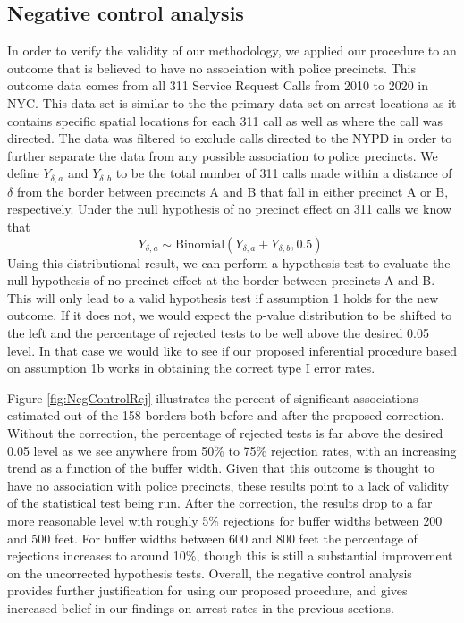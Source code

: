 \documentclass[a4paper,11pt]{article}
\begin{document}
\subsection{Negative control analysis}

In order to verify the validity of our methodology, we applied our procedure to an outcome that is believed to have no association with police precincts. This outcome data comes from all 311 Service Request Calls from 2010 to 2020 in NYC. This data set is similar to the the primary data set on arrest locations as it contains specific spatial locations for each 311 call as well as where the call was directed. The data was filtered to exclude calls directed to the NYPD in order to further separate the data from any possible association to police precincts. We define $Y_{\delta, a}$ and $Y_{\delta, b}$ to be the total number of 311 calls made within a distance of $\delta$ from the border between precincts A and B that fall in either precinct A or B, respectively. Under the null hypothesis of no precinct effect on 311 calls we know that 
$$Y_{\delta, a} \sim \text{Binomial}(Y_{\delta, a} + Y_{\delta, b}, 0.5).$$
Using this distributional result, we can perform a hypothesis test to evaluate the null hypothesis of no precinct effect at the border between precincts A and B. This will only lead to a valid hypothesis test if assumption 1 holds for the new outcome. If it does not, we would expect the p-value distribution to be shifted to the left and the percentage of rejected tests to be well above the desired 0.05 level. In that case we would like to see if our proposed inferential procedure based on assumption 1b works in obtaining the correct type I error rates.

Figure \ref{fig:NegControlRej} illustrates the percent of significant associations estimated out of the 158 borders both before and after the proposed correction. Without the correction, the percentage of rejected tests is far above the desired 0.05 level as we see anywhere from 50\% to 75\% rejection rates, with an increasing trend as a function of the buffer width. Given that this outcome is thought to have no association with police precincts, these results point to a lack of validity of the statistical test being run. After the correction, the results drop to a far more reasonable level with roughly 5\% rejections for buffer widths between 200 and 500 feet. For buffer widths between 600 and 800 feet the percentage of rejections increases to around 10\%, though this is still a substantial improvement on the uncorrected hypothesis tests. Overall, the negative control analysis provides further justification for using our proposed procedure, and gives increased belief in our findings on arrest rates in the previous sections.
\end{document}
